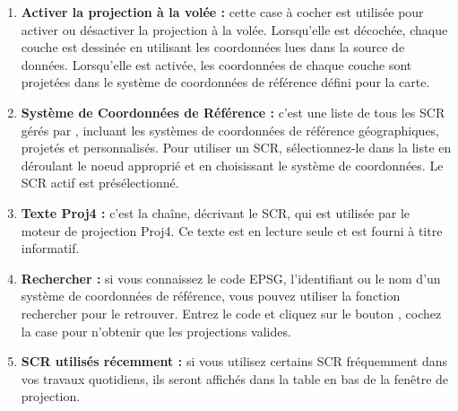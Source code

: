 \begin{enumerate}
\item \textbf{Activer la projection à la volée :}  cette case à cocher est utilisée pour activer ou désactiver la projection à la volée. Lorsqu'elle est décochée, chaque couche est dessinée en utilisant les coordonnées lues dans la source de données. Lorsqu'elle est activée, les coordonnées de chaque couche sont projetées dans le système de coordonnées de référence défini pour la carte.
\item \textbf{Système de Coordonnées de Référence :} c'est une liste de tous les SCR gérés par \qg, incluant les systèmes de coordonnées de référence  géographiques, projetés et personnalisés. Pour utiliser un SCR, sélectionnez-le  dans la liste en déroulant le noeud approprié et en choisissant le système de coordonnées. Le SCR actif est présélectionné.
\item \textbf{Texte Proj4 :} c'est la chaîne, décrivant le SCR, qui est utilisée  par le moteur de projection Proj4. Ce texte est en lecture seule et est fourni  à titre informatif.
\item \textbf{Rechercher :} si vous connaissez le code EPSG, l'identifiant ou le nom d'un système de coordonnées de référence, vous pouvez utiliser la fonction rechercher pour le retrouver. Entrez le code et cliquez sur le bouton , cochez la case  pour n'obtenir que les projections valides.
\item \textbf{SCR utilisés récemment :} si vous utilisez certains SCR fréquemment dans vos travaux quotidiens, ils seront affichés dans la table en bas de la fenêtre de projection.
\end{enumerate}

